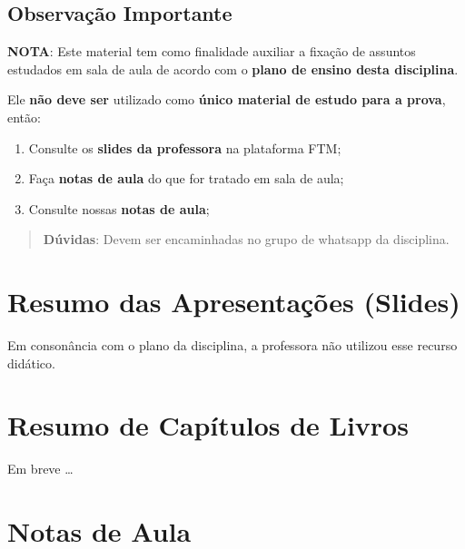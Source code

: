\documentclass[
]{book}
\providecommand{\tightlist}{%
  \setlength{\itemsep}{0pt}\setlength{\parskip}{0pt}}
\begin{document}
\hypertarget{observauxe7uxe3o-importante}{%
\section{Observação Importante}\label{observauxe7uxe3o-importante}}

\textbf{NOTA}: Este material tem como finalidade auxiliar a fixação de assuntos estudados em sala de aula de acordo com o \textbf{plano de ensino desta disciplina}.

Ele \textbf{não deve ser} utilizado como \textbf{único material de estudo para a prova}, então:

\begin{enumerate}
\def\labelenumi{\arabic{enumi}.}
\tightlist
\item
  Consulte os \textbf{slides da professora} na plataforma FTM;\\
\item
  Faça \textbf{notas de aula} do que for tratado em sala de aula;\\
\item
  Consulte nossas \textbf{notas de aula};
\end{enumerate}

\begin{quote}
\textbf{Dúvidas}: Devem ser encaminhadas no grupo de whatsapp da disciplina.
\end{quote}

\hypertarget{resumo-das-apresentauxe7uxf5es-slides}{%
\chapter{Resumo das Apresentações (Slides)}\label{resumo-das-apresentauxe7uxf5es-slides}}

Em consonância com o plano da disciplina, a professora não utilizou esse recurso didático.

\hypertarget{resumo-de-capuxedtulos-de-livros}{%
\chapter{Resumo de Capítulos de Livros}\label{resumo-de-capuxedtulos-de-livros}}

Em breve \ldots{}

\hypertarget{notas-de-aula}{%
\chapter{Notas de Aula}\label{notas-de-aula}}
\end{document}
